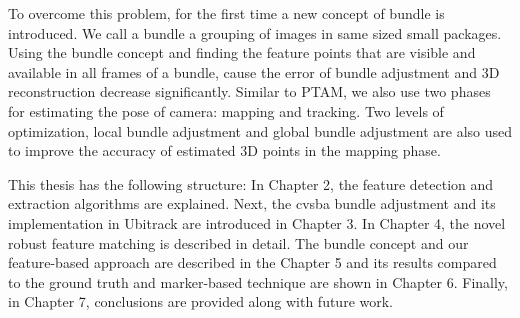 To overcome this problem, for the first time a new concept of bundle is introduced. We call a bundle a grouping of images in same sized small packages. Using the bundle concept and finding the feature points that are visible and available in all frames of a bundle, cause the error of bundle adjustment and 3D reconstruction decrease significantly. Similar to PTAM, we also use two phases for estimating the pose of camera: mapping and tracking. Two levels of optimization, local bundle adjustment and global bundle adjustment are also used to improve the accuracy of estimated 3D points in the mapping phase.

This thesis has the following structure: In Chapter 2, the feature detection and extraction algorithms are explained. Next, the cvsba bundle adjustment and its implementation in Ubitrack are introduced in Chapter 3. In Chapter 4, the novel robust feature matching is described in detail. The bundle concept and our feature-based approach are described in the Chapter 5 and its results compared to the ground truth and marker-based technique are shown in Chapter 6. Finally, in Chapter 7, conclusions are provided along with future work.
